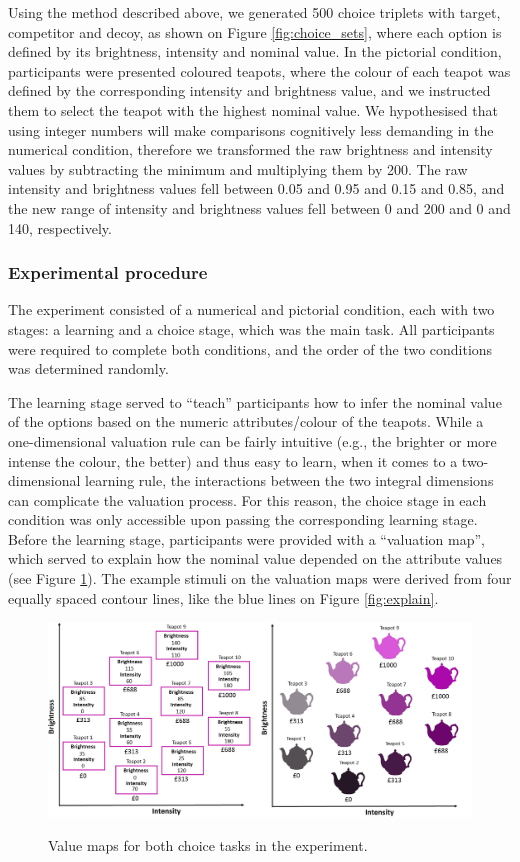 \documentclass[11pt,a4paper]{article}
\begin{document}
Using the method described above, we generated 500 choice triplets with target, competitor and decoy, as shown on Figure \ref{fig:choice_sets}, where each option is defined by its brightness, intensity and nominal value. In the pictorial condition, participants were presented coloured teapots, where the colour of each teapot was defined by the corresponding intensity and brightness value, and we instructed them to select the teapot with the highest nominal value. We hypothesised that using integer numbers will make comparisons cognitively less demanding in the numerical condition, therefore we transformed the raw brightness and intensity values by subtracting the minimum and multiplying them by 200. The raw intensity and brightness values fell between 0.05 and 0.95 and 0.15 and 0.85, and the new range of intensity and brightness values fell between 0 and 200 and 0 and 140, respectively.




\subsubsection{Experimental procedure}

The experiment consisted of a numerical and pictorial condition, each with two stages: a learning and a choice stage, which was the main task.  All participants were required to complete both conditions, and the order of the two conditions was determined randomly. 


The learning stage served to ``teach''  participants how to infer the nominal value of the options based on the numeric attributes/colour of the teapots. While a one-dimensional valuation rule can be fairly intuitive (e.g., the brighter or more intense the colour, the better) and thus easy to learn, when it comes to a two-dimensional learning rule, the interactions between the two integral dimensions can complicate the valuation process. For this reason, the choice stage in each condition was only accessible upon passing the corresponding learning stage. Before the learning stage, participants  were provided with a ``valuation map'', which served to explain how the nominal value depended on the attribute values (see Figure \ref{fig:valuemaps}). The example stimuli on the valuation maps were derived from four equally spaced contour lines, like the blue lines on Figure \ref{fig:explain}.


\begin{figure}[htp]
\centering
\caption{Value maps for both choice tasks in the experiment.}
\includegraphics[width=1\textwidth]{./value_maps.png}
\label{fig:valuemaps}
\end{figure}
\end{document}
